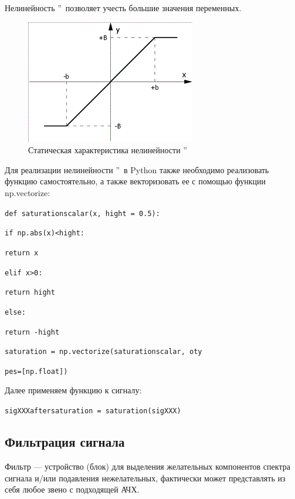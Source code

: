 Нелинейность \textquotedblright\ позволяет учесть большие значения переменных.
\begin{figure}[H]
	\centering
	\includegraphics[width=0.5\linewidth]{body/templates/saturation.png}
	\caption{Статическая характеристика нелинейности \textquotedblright}
	\label{fig:6}
\end{figure}

Для реализации нелинейности \textquotedblright\ в Python также необходимо реализовать функцию самостоятельно, 
а также векторизовать ее с помощью функции np.vectorize:

\texttt{def saturation\textunderscore scalar(x, hight = 0.5):}

\texttt{\hspace{10mm}if np.abs(x)<hight:}

\texttt{\hspace{20mm}return x}

\texttt{\hspace{10mm}elif x>0:}

\texttt{\hspace{20mm}return hight}

\texttt{\hspace{10mm}else:}

\texttt{\hspace{20mm}return -hight}

\texttt{saturation = np.vectorize(saturation\textunderscore scalar, oty}

\texttt{pes=[np.float])}

Далее применяем функцию к сигналу:

\texttt{sig\textunderscore XXX\textunderscore after\textunderscore saturation = saturation(sig\textunderscore XXX)}
\subsection{Фильтрация сигнала}
Фильтр — устройство (блок) для выделения желательных компонентов спектра сигнала и/или подавления нежелательных, 
фактически может представлять из себя любое звено с подходящей АЧХ.

